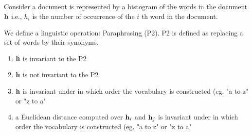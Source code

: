 \begin{frame}
\section{}
Consider a document is represented by a histogram of the words in the document ${\bf h}$ i.e., $h_i$ is the
number of occurrence of the $i$ th word in the document.

We define a linguistic operation: Paraphrasing (P2). P2 is defined as replacing a set of words by their synonyms.

\begin{enumerate}
\item ${\bf h}$ is invariant to the P2
\item ${\bf h}$ is not invariant to the P2    %
\item ${\bf h}$ is invariant under in which order the vocabulary is constructed (eg. "a to z" or "z to a"
\item a Euclidean distance computed over ${\bf h}_i$ and ${\bf h}_j$ is invariant under in which order the vocabulary is constructed (eg. "a to z" or "z to a"
\end{enumerate}
\end{frame}

